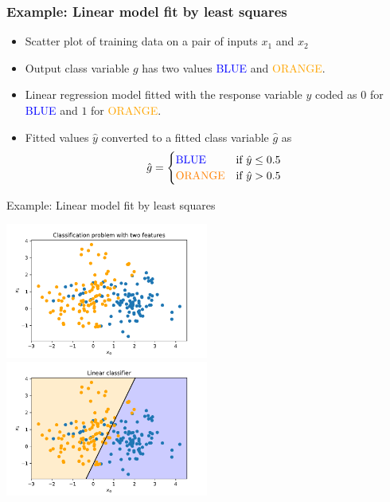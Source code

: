 \documentclass[notes]{beamer}          %
\begin{document}
\begin{frame}
\frametitle{Example: Linear model fit by least squares}
\begin{itemize}
    \item Scatter plot of training data on a pair of inputs $x_1$ and $x_2$
    \item Output class variable $g$ has two values \textcolor{blue}{BLUE} and \textcolor{orange}{ORANGE}.
    \item Linear regression model fitted with the response variable $y$ coded as $0$ for \textcolor{blue}{BLUE} and $1$ for \textcolor{orange}{ORANGE}.
    \item Fitted values $\hat{y}$ converted to a fitted class variable $\hat{g}$ as
    \[ \hat{g} = \begin{cases}
                    \text{\textcolor{blue}{BLUE}}  & \text{if $\hat{y} \leq 0.5$} \\
                    \text{\textcolor{orange}{ORANGE}} & \text{if $\hat{y} > 0.5$ }
                 \end{cases} \]

\end{itemize}
\end{frame}

\begin{frame}{Example: Linear model fit by least squares}
    \begin{center}
        \includegraphics[width=0.5\textwidth]{figures/week_1/classification_problem.pdf}
        \hfill
        \includegraphics[width=0.5\textwidth]{figures/week_1/linear_model.pdf}
        \end{center}
\end{frame}
\end{document}
